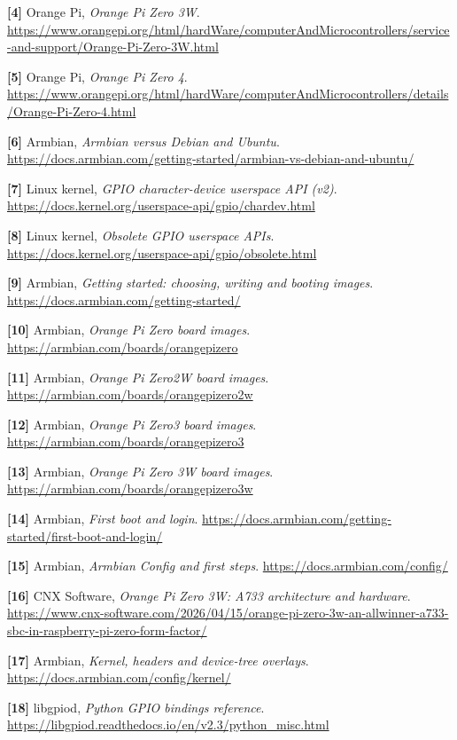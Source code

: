 \documentclass[10pt,oneside,openany]{report}
\begin{document}
\noindent\textbf{[4]} Orange Pi, \emph{Orange Pi Zero 3W}. \url{https://www.orangepi.org/html/hardWare/computerAndMicrocontrollers/service-and-support/Orange-Pi-Zero-3W.html}

\noindent\textbf{[5]} Orange Pi, \emph{Orange Pi Zero 4}. \url{https://www.orangepi.org/html/hardWare/computerAndMicrocontrollers/details/Orange-Pi-Zero-4.html}

\noindent\textbf{[6]} Armbian, \emph{Armbian versus Debian and Ubuntu}. \url{https://docs.armbian.com/getting-started/armbian-vs-debian-and-ubuntu/}

\noindent\textbf{[7]} Linux kernel, \emph{GPIO character-device userspace API (v2)}. \url{https://docs.kernel.org/userspace-api/gpio/chardev.html}

\noindent\textbf{[8]} Linux kernel, \emph{Obsolete GPIO userspace APIs}. \url{https://docs.kernel.org/userspace-api/gpio/obsolete.html}

\noindent\textbf{[9]} Armbian, \emph{Getting started: choosing, writing and booting images}. \url{https://docs.armbian.com/getting-started/}

\noindent\textbf{[10]} Armbian, \emph{Orange Pi Zero board images}. \url{https://armbian.com/boards/orangepizero}

\noindent\textbf{[11]} Armbian, \emph{Orange Pi Zero2W board images}. \url{https://armbian.com/boards/orangepizero2w}

\noindent\textbf{[12]} Armbian, \emph{Orange Pi Zero3 board images}. \url{https://armbian.com/boards/orangepizero3}

\noindent\textbf{[13]} Armbian, \emph{Orange Pi Zero 3W board images}. \url{https://armbian.com/boards/orangepizero3w}

\noindent\textbf{[14]} Armbian, \emph{First boot and login}. \url{https://docs.armbian.com/getting-started/first-boot-and-login/}

\noindent\textbf{[15]} Armbian, \emph{Armbian Config and first steps}. \url{https://docs.armbian.com/config/}

\noindent\textbf{[16]} CNX Software, \emph{Orange Pi Zero 3W: A733 architecture and hardware}. \url{https://www.cnx-software.com/2026/04/15/orange-pi-zero-3w-an-allwinner-a733-sbc-in-raspberry-pi-zero-form-factor/}

\noindent\textbf{[17]} Armbian, \emph{Kernel, headers and device-tree overlays}. \url{https://docs.armbian.com/config/kernel/}

\noindent\textbf{[18]} libgpiod, \emph{Python GPIO bindings reference}. \url{https://libgpiod.readthedocs.io/en/v2.3/python_misc.html}
\end{document}
